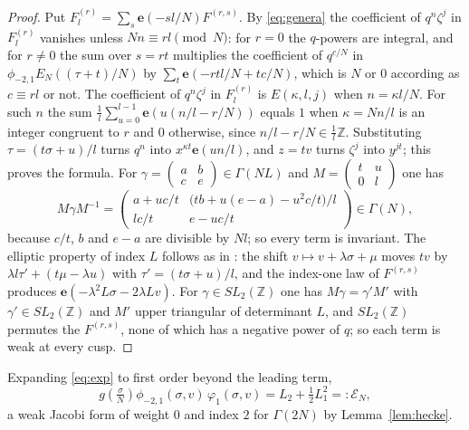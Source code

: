 \documentclass[11pt]{amsart}
\numberwithin{equation}{section}
\theoremstyle{plain}
\theoremstyle{remark}
\newcommand{\Z}{\mathbb{Z}}
\newcommand{\cE}{\mathcal{E}}
\newcommand{\e}{\mathbf{e}}
\newcommand{\pmi}{\phi_{-2,1}}
\begin{document}
\begin{proof}
Put $F^{(r)}_l=\sum_s\e(-sl/N)F^{(r,s)}$. By \eqref{eq:genera} the coefficient of $q^n\zeta^j$ in $F^{(r)}_l$ vanishes unless $Nn\equiv rl\pmod N$: for $r=0$ the $q$-powers are integral, and for $r\ne0$ the sum over $s=rt$ multiplies the coefficient of $q^{c/N}$ in $\pmi E_N((\tau+t)/N)$ by $\sum_t\e(-rtl/N+tc/N)$, which is $N$ or $0$ according as $c\equiv rl$ or not. The coefficient of $q^n\zeta^j$ in $F^{(r)}_l$ is $E(\kappa,l,j)$ when $n=\kappa l/N$. For such $n$ the sum $\frac1l\sum_{u=0}^{l-1}\e(u(n/l-r/N))$ equals $1$ when $\kappa=Nn/l$ is an integer congruent to $r$ and $0$ otherwise, since $n/l-r/N\in\frac1l\Z$. Substituting $\tau=(t\sigma+u)/l$ turns $q^n$ into $x^{\kappa t}\e(un/l)$, and $z=tv$ turns $\zeta^j$ into $y^{jt}$; this proves the formula. For $\gamma=\left(\begin{smallmatrix}a&b\\c&e\end{smallmatrix}\right)\in\Gamma(NL)$ and $M=\left(\begin{smallmatrix}t&u\\0&l\end{smallmatrix}\right)$ one has
\[
M\gamma M^{-1}=\begin{pmatrix}a+uc/t& \bigl(tb+u(e-a)-u^2c/t\bigr)/l\\ lc/t& e-uc/t\end{pmatrix}\in\Gamma(N),
\]
because $c/t$, $b$ and $e-a$ are divisible by $Nl$; so every term is invariant. The elliptic property of index $L$ follows as in \cite[Lemma~1]{Bha26a}: the shift $v\mapsto v+\lambda\sigma+\mu$ moves $tv$ by $\lambda l\tau'+(t\mu-\lambda u)$ with $\tau'=(t\sigma+u)/l$, and the index-one law of $F^{(r,s)}$ produces $\e(-\lambda^2L\sigma-2\lambda Lv)$. For $\gamma\in SL_2(\Z)$ one has $M\gamma=\gamma'M'$ with $\gamma'\in SL_2(\Z)$ and $M'$ upper triangular of determinant $L$, and $SL_2(\Z)$ permutes the $F^{(r,s)}$, none of which has a negative power of $q$; so each term is weak at every cusp.
\end{proof}

Expanding \eqref{eq:exp} to first order beyond the leading term,
\begin{equation}\label{eq:numerator}
g\!\left(\tfrac\sigma N\right)\pmi(\sigma,v)\,\varphi_1(\sigma,v)=L_2+\tfrac12L_1^2=:\cE_N,
\end{equation}
a weak Jacobi form of weight $0$ and index $2$ for $\Gamma(2N)$ by Lemma~\ref{lem:hecke}.
\end{document}
